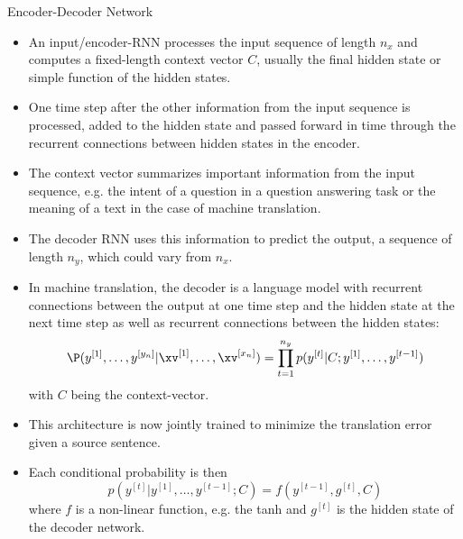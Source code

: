 \begin{vbframe}{Encoder-Decoder Network}
\begin{itemize}
    \item An input/encoder-RNN processes the input sequence of length $n_x$ and computes a fixed-length context vector $C$, usually the final hidden state or  simple function of the hidden states.
    \item One time step after the other information from the input sequence is processed, added to the hidden state and passed forward in time through the recurrent connections between hidden states in the encoder.
    \item  The context vector summarizes important information from the input sequence, e.g. the intent of a question in a question answering task or the meaning of a text in the case of machine translation.
    \item The decoder RNN uses this information to predict the output, a sequence of length $n_y$, which could vary from $n_x$. 
    \item In machine translation, the decoder is a language model with recurrent connections between the output at one time step and the hidden state at the next time step as well as recurrent connections between the hidden states:
    $$\P(y^{[1]}, \dots, y^{[y_n]}|\xv^{[1]}, \dots, \xv^{[x_n]}) = \displaystyle \prod_{t=1}^{n_y} p(y^{[t]}|C; y^{[1]}, \dots, y^{[t-1]})$$ with $C$ being the context-vector.
    \item This architecture is now jointly trained to minimize the translation
error given a source sentence.
    \item Each conditional probability is then $$p(y^{[t]}|y^{[1]}, \dots, y^{[t-1]};C) = f(y^{[t-1]}, g^{[t]}, C)$$ where $f$ is a non-linear function, e.g. the tanh and $g^{[t]}$ is the hidden state of the decoder network.
  \end{itemize}
\end{vbframe}

